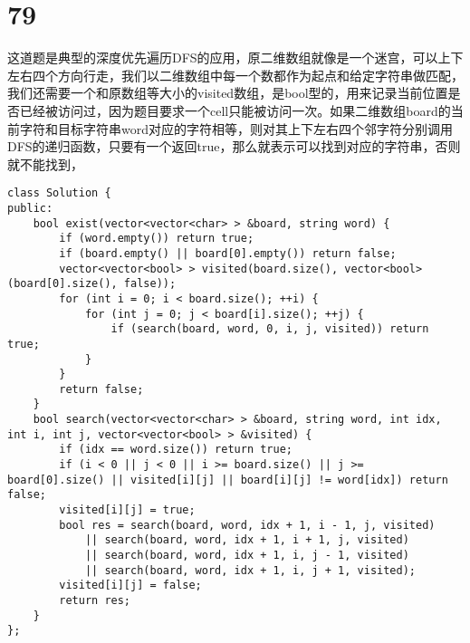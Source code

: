 \documentclass[12pt,a4paper]{article}
\begin{document}
\section{79}
\begin{CJK}{UTF8}{gbsn}
这道题是典型的深度优先遍历DFS的应用，原二维数组就像是一个迷宫，可以上下左右四个方向行走，我们以二维数组中每一个数都作为起点和给定字符串做匹配，我们还需要一个和原数组等大小的visited数组，是bool型的，用来记录当前位置是否已经被访问过，因为题目要求一个cell只能被访问一次。如果二维数组board的当前字符和目标字符串word对应的字符相等，则对其上下左右四个邻字符分别调用DFS的递归函数，只要有一个返回true，那么就表示可以找到对应的字符串，否则就不能找到，
\end{CJK}
\begin{lstlisting}
class Solution {
public:
	bool exist(vector<vector<char> > &board, string word) {
		if (word.empty()) return true;
		if (board.empty() || board[0].empty()) return false;
		vector<vector<bool> > visited(board.size(), vector<bool>(board[0].size(), false));
		for (int i = 0; i < board.size(); ++i) {
			for (int j = 0; j < board[i].size(); ++j) {
				if (search(board, word, 0, i, j, visited)) return true;
			}
		}
		return false;
	}
	bool search(vector<vector<char> > &board, string word, int idx, int i, int j, vector<vector<bool> > &visited) {
		if (idx == word.size()) return true;
		if (i < 0 || j < 0 || i >= board.size() || j >= board[0].size() || visited[i][j] || board[i][j] != word[idx]) return false;
		visited[i][j] = true;
		bool res = search(board, word, idx + 1, i - 1, j, visited)
			|| search(board, word, idx + 1, i + 1, j, visited)
			|| search(board, word, idx + 1, i, j - 1, visited)
			|| search(board, word, idx + 1, i, j + 1, visited);
		visited[i][j] = false;
		return res;
	}
};
\end{lstlisting}
\end{document}
